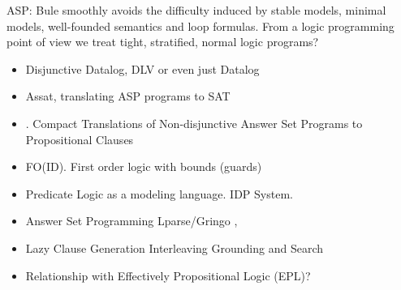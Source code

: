 \documentclass[conference]{IEEEtran}
\begin{document}
ASP: Bule smoothly avoids the difficulty induced by stable models, minimal models, well-founded 
semantics and loop formulas. From a logic programming point of view we treat tight, stratified, normal logic programs?

\begin{itemize}
    \item Disjunctive Datalog, DLV \cite{Eiter97} or even just Datalog \cite{Gottlob89}
    \item Assat, translating ASP programs to SAT \cite{Lin04}
    \item \cite{Janhunen11}. Compact Translations of Non-disjunctive Answer Set
        Programs to Propositional Clauses
    \item FO(ID). First order logic with bounds (guards) \cite{Wittocx10}
    \item Predicate Logic as a modeling language. IDP System. \cite{Cat18}
    \item Answer Set Programming Lparse/Gringo \cite{Gebser15}, \cite{Ferraris05}
    \item Lazy Clause Generation Interleaving Grounding and Search \cite{Cat15}
    \item Relationship with Effectively Propositional Logic (EPL)? 
\end{itemize}



\end{document}
